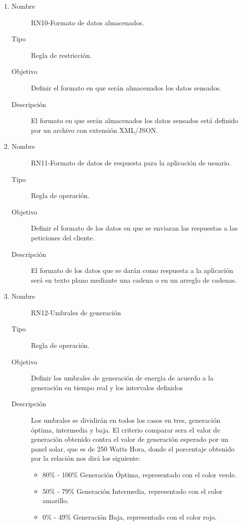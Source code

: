 \begin{enumerate}[label=RN\arabic*.]

\item \label{RN10}
		\begin{description}
			\item[Nombre] RN10-Formato de datos almacenados.
			\item[Tipo] Regla de restricción.
			\item[Objetivo] Definir el formato en que serán almacenados los datos sensados.
			\item[Descripción] El formato en que serán almacenados los datos sensados está definido por un archivo con extensión XML/JSON. 
		\end{description}
		
\item \label{RN11}
		\begin{description}
			\item[Nombre] RN11-Formato de datos de respuesta para la aplicación de usuario.
			\item[Tipo] Regla de operación.
			\item[Objetivo] Definir el formato de los datos en que se enviaran las respuestas a las peticiones del cliente.
			\item[Descripción] El formato de los datos que se darán como respuesta a la aplicación será en texto plano mediante una cadena o en un arreglo de cadenas.
		\end{description}
		
\item \label{RN12}
		\begin{description}
			\item[Nombre] RN12-Umbrales de generación
			\item[Tipo] Regla de operación.
			\item[Objetivo] Definir los umbrales de generación de energía de acuerdo a la generación en tiempo real y los intervalos definidos 
			\item[Descripción] Los umbrales se dividirán en todos los casos en tres, generación óptima, intermedia y baja.
			El criterio comparar sera el valor de generación obtenido contra el valor de generación esperado por un panel solar, que es de 250 Watts Hora, donde el porcentaje obtenido por la relación nos dirá los siguiente:
			\begin{itemize}
			    \item 80\% - 100\% Generación Óptima, representado con el color verde.
			    \item 50\% - 79\% Generación Intermedia, representado con el color amarillo.
			    \item 0\% - 49\% Generación Baja, representado con el color rojo.
			\end{itemize}
		\end{description}
	

\end{enumerate}
